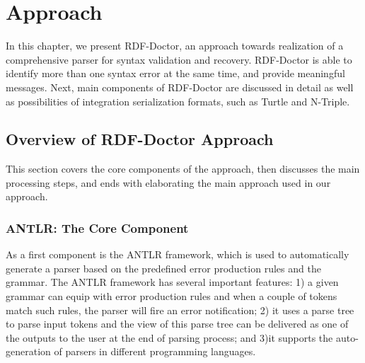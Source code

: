 \chapter{Approach}
\label{ch:approach}
In this chapter, we present RDF-Doctor, an approach towards realization of a comprehensive parser for syntax validation and recovery.
RDF-Doctor is able to identify more than one syntax error at the same time, and provide meaningful messages.
Next, main components of RDF-Doctor are discussed in detail as well as possibilities of integration serialization formats, such as Turtle and N-Triple.


\section{Overview of RDF-Doctor Approach}

This section covers the core components of the approach, then discusses the main processing steps, and ends with elaborating the main approach used in our approach. 

\subsection{ANTLR: The Core Component}

As a first component is the ANTLR framework, which is used to automatically generate a parser based on the predefined error production rules and the grammar.
The ANTLR framework has several important features: 1) a given grammar can equip with error production rules and when a couple of tokens match such rules, the parser will fire an error notification; 2) it uses a parse tree to parse input tokens and the view of this parse tree can be delivered as one of the outputs to the user at the end of parsing process; and 3)it supports the auto-generation of parsers in different programming languages.

